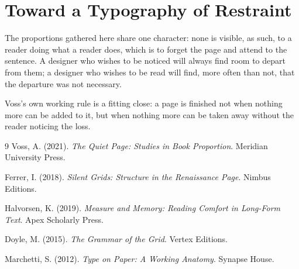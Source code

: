 \documentclass[11pt,paper=a4,footinclude=true,headinclude=true,open=any]{scrbook}
\begin{document}
\section{Toward a Typography of Restraint}
\label{sec:conclusion}

The proportions gathered here share one character: none is visible, as such, to a reader doing what a reader does, which is to forget the page and attend to the sentence. A designer who wishes to be noticed will always find room to depart from them; a designer who wishes to be read will find, more often than not, that the departure was not necessary.

Voss's own working rule is a fitting close: a page is finished not when nothing more can be added to it, but when nothing more can be taken away without the reader noticing the loss.

\backmatter

\begin{thebibliography}{9}
Voss, A. (2021). \emph{The Quiet Page: Studies in Book Proportion}. Meridian University Press.

Ferrer, I. (2018). \emph{Silent Grids: Structure in the Renaissance Page}. Nimbus Editions.

Halvorsen, K. (2019). \emph{Measure and Memory: Reading Comfort in Long-Form Text}. Apex Scholarly Press.

Doyle, M. (2015). \emph{The Grammar of the Grid}. Vertex Editions.

Marchetti, S. (2012). \emph{Type on Paper: A Working Anatomy}. Synapse House.

\end{thebibliography}
\end{document}
